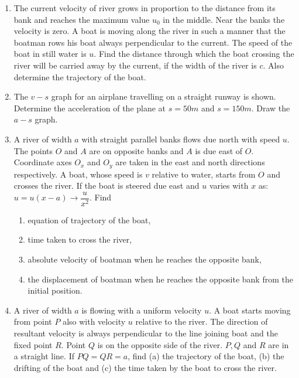 \documentclass{article}
\renewcommand{\frac}[2]{\dfrac{#1}{#2}}
\begin{document}
\begin{enumerate}
    \item The current velocity of river grows in proportion to the distance from its bank and reaches the maximum value \( u_0 \) in the middle. Near the banks the velocity is zero. A boat is moving along the river in such a manner that the boatman rows his boat always perpendicular to the current. The speed of the boat in still water is \( u \). Find the distance through which the boat crossing the river will be carried away by the current, if the width of the river is \( c \). Also determine the trajectory of the boat.
    \item The \( v-s \) graph for an airplane travelling on a straight runway is shown. Determine the acceleration of the plane at \( s = 50 m \) and \( s = 150 m \). Draw the \( a-s \) graph.
    \begin{center}
    \end{center}

    
    \item A river of width \( a \) with straight parallel banks flows due north with speed \( u \). The points \( O \) and \( A \) are on opposite banks and \( A \) is due east of \( O \). Coordinate axes \( O_x \) and \( O_y \) are taken in the east and north directions respectively. A boat, whose speed is \( v \) relative to water, starts from \( O \) and crosses the river. If the boat is steered due east and \( u \) varies with \( x \) as: \( u = u(x-a) \to \frac{u}{x^2} \). Find
    \begin{enumerate}
        \item equation of trajectory of the boat,
        \item time taken to cross the river,
        \item absolute velocity of boatman when he reaches the opposite bank,
        \item the displacement of boatman when he reaches the opposite bank from the initial position.
    \end{enumerate}
    
    \item A river of width \( a \) is flowing with a uniform velocity \( u \). A boat starts moving from point \( P \) also with velocity \( u \) relative to the river. The direction of resultant velocity is always perpendicular to the line joining boat and the fixed point \( R \). Point \( Q \) is on the opposite side of the river. \( P, Q \) and \( R \) are in a straight line. If \( PQ = QR = a \), find (a) the trajectory of the boat, (b) the drifting of the boat and (c) the time taken by the boat to cross the river.
    \begin{center}
    \end{center}


\end{enumerate}
\end{document}
